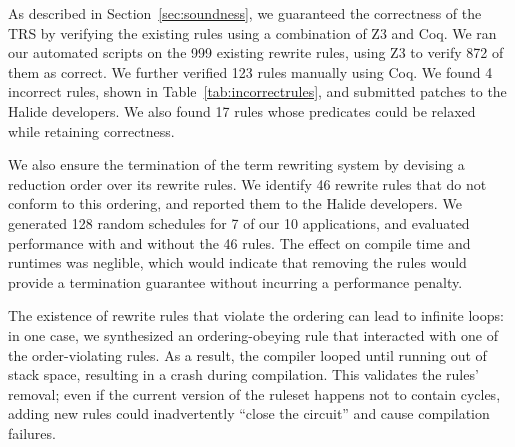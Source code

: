 \documentclass[sigplan,10pt,review,anonymous]{acmart}\settopmatter{printfolios=true,printccs=false,printacmref=false}
\newcommand{\NumApps}{{\color{black} 10}\xspace}
\newcommand{\NumRulesFixed}{{\color{black} 4}\xspace}
\newcommand{\NumPredicatesRelaxed}{{\color{black} 17}\xspace}
\newcommand{\NumOrderingProblems}{{\color{black} 46}\xspace}
\newcommand{\NumOriginalRules}{{\color{black} 999}\xspace}
\begin{document}
As described in Section~\ref{sec:soundness}, we guaranteed the correctness of
the TRS by verifying the existing rules using a combination of Z3 and
Coq. We ran our automated scripts on the \NumOriginalRules existing rewrite rules, using Z3
to verify 872 of them as correct.  We further verified 123 rules manually using
Coq.  We found \NumRulesFixed incorrect rules, shown in Table~\ref{tab:incorrectrules},
and submitted patches to the Halide developers. We also found
\NumPredicatesRelaxed rules whose predicates could be relaxed while retaining
correctness.

We also ensure the termination of the term rewriting system by devising a reduction order
over its rewrite rules. We identify \NumOrderingProblems rewrite rules that do
not conform to this ordering, and reported them to the Halide developers. We
generated 128 random schedules for 7 of our \NumApps applications, and evaluated
performance with and without the \NumOrderingProblems rules. The effect on compile time and runtimes was neglible, which would indicate that removing the rules would provide a termination guarantee without incurring a performance penalty.



The existence of rewrite rules that violate the ordering can lead
to infinite loops: in one case, we synthesized an ordering-obeying rule that interacted
with one of the order-violating rules.  As a result, the compiler
looped until running out of stack space, resulting in a crash
during compilation. This validates the rules' removal; even if the current version of the ruleset happens not to contain cycles, adding new rules could inadvertently ``close the circuit'' and cause compilation failures.

\end{document}
